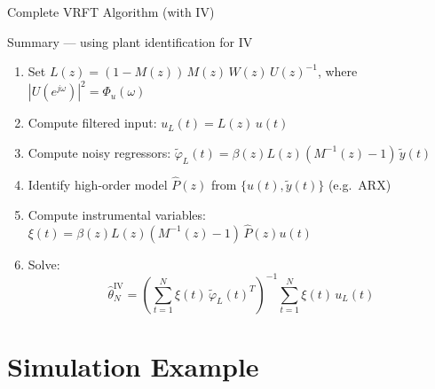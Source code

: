 \documentclass[hyperref={pdfpagemode=FullScreen},aspectratio=169]{beamer}
\begin{document}
\begin{frame}{Complete VRFT Algorithm (with IV)}
  \begin{block}{Summary --- using plant identification for IV}
    \begin{enumerate}
      \setlength{\itemsep}{1em}
      \item Set $L(z) = (1-M(z))\,M(z)\,W(z)\,U(z)^{-1}$, where $|U(e^{j\omega})|^2 = \Phi_u(\omega)$
      \item Compute filtered input: $u_L(t) = L(z)\,u(t)$
      \item Compute noisy regressors: $\tilde{\varphi}_L(t) = \beta(z)L(z)(M^{-1}(z)-1)\,\tilde{y}(t)$
      \item Identify high-order model $\hat{P}(z)$ from $\{u(t),\tilde{y}(t)\}$ (e.g.\ ARX)
      \item Compute instrumental variables: $\xi(t) = \beta(z)L(z)(M^{-1}(z)-1)\,\hat{P}(z)u(t)$
      \item Solve:
        \[
          \hat{\theta}^{\mathrm{IV}}_N = \left(\sum_{t=1}^{N}\xi(t)\,\tilde{\varphi}_L(t)^T\right)^{-1}\!\sum_{t=1}^{N}\xi(t)\,u_L(t)
        \]
    \end{enumerate}
  \end{block}
\end{frame}

\section{Simulation Example}
\end{document}
